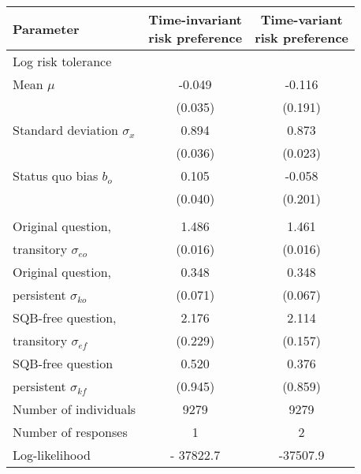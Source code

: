 {
\begin{tabular}{l *{2}{c}}
	\toprule
	\textbf{Parameter} & \thead{Time-invariant\\ risk preference} & \thead{Time-variant\\ risk preference} \\
	\midrule
	\multicolumn{3}{l}{Log risk tolerance}\\
	\hspace{2em} Mean $\mu$ & -0.049 & -0.116 \\
	 & (0.035) & (0.191) \\
	\hspace{2em} Standard deviation $\sigma_x$ & 0.894 & 0.873 \\
	 & (0.036) & (0.023) \\
	Status quo bias $b_o$ & 0.105 & -0.058 \\
	& (0.040) & (0.201) \\
	
	\addlinespace 
	\multicolumn{3}{l}{Response error standard deviation}\\
	\hspace{2em} Original question, & 1.486 & 1.461 \\
	\hspace{3em} transitory $\sigma_{eo}$ & (0.016) & (0.016) \\
	\hspace{2em} Original question, & 0.348 & 0.348 \\
	\hspace{3em} persistent $\sigma_{ko}$ & (0.071) & (0.067) \\
	\hspace{2em} SQB-free question,  & 2.176 & 2.114 \\
	\hspace{3em} transitory $\sigma_{ef}$ & (0.229) & (0.157) \\
	\hspace{2em} SQB-free question & 0.520 & 0.376 \\
	\hspace{3em} persistent $\sigma_{kf}$ & (0.945) & (0.859) \\
	\midrule
	Number of individuals & 9279 & 9279 \\
	Number of responses & 1 & 2 \\
	Log-likelihood & - 37822.7 & -37507.9 \\
	\bottomrule
\end{tabular}
}